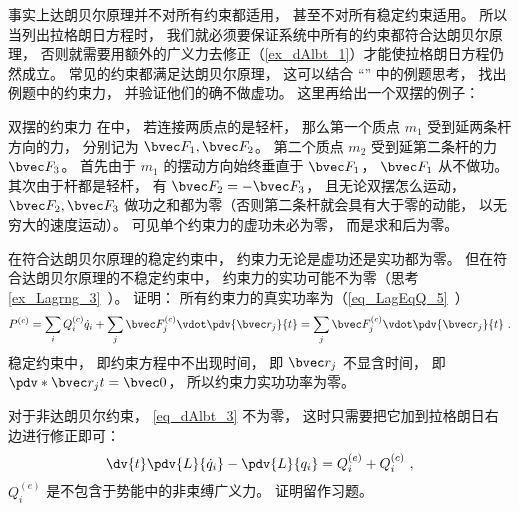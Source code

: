事实上达朗贝尔原理并不对所有约束都适用， 甚至不对所有稳定约束适用。 所以当列出拉格朗日方程时， 我们就必须要保证系统中所有的约束都符合达朗贝尔原理， 否则就需要用额外的广义力去修正（\autoref{ex_dAlbt_1}）才能使拉格朗日方程仍然成立。 常见的约束都满足达朗贝尔原理， 这可以结合 “” 中的例题思考， 找出例题中的约束力， 并验证他们的确不做虚功。 这里再给出一个双摆的例子：

\begin{example}{双摆的约束力}
在中， 若连接两质点的是轻杆， 那么第一个质点 $m_1$ 受到延两条杆方向的力， 分别记为 $\bvec F_1, \bvec F_2$。 第二个质点 $m_2$ 受到延第二条杆的力 $\bvec F_3$。 首先由于 $m_1$ 的摆动方向始终垂直于 $\bvec F_1$， $\bvec F_1$ 从不做功。 其次由于杆都是轻杆， 有 $\bvec F_2 = -\bvec F_3$， 且无论双摆怎么运动， $\bvec F_2, \bvec F_3$ 做功之和都为零（否则第二条杆就会具有大于零的动能， 以无穷大的速度运动）。 可见单个约束力的虚功未必为零， 而是求和后为零。
\end{example}

在符合达朗贝尔原理的稳定约束中， 约束力无论是虚功还是实功都为零。 但在符合达朗贝尔原理的不稳定约束中， 约束力的实功可能不为零（思考\autoref{ex_Lagrng_3}~）。 证明： 所有约束力的真实功率为（\autoref{eq_LagEqQ_5}~）
\begin{equation}
P^{(c)} = \sum_i Q_i^{(c)} \dot q_i + \sum_j \bvec F_j^{(c)} \vdot \pdv{\bvec r_j}{t} = \sum_j \bvec F_j^{(c)} \vdot \pdv{\bvec r_j}{t}~.
\end{equation}
稳定约束中， 即约束方程中不出现时间， 即 $\bvec r_j$ 不显含时间， 即 $\pdv*{\bvec r_j}{t} = \bvec 0$， 所以约束力实功功率为零。

对于非达朗贝尔约束， \autoref{eq_dAlbt_3} 不为零， 这时只需要把它加到拉格朗日右边进行修正即可：
\begin{equation}
\dv{t}\pdv{L}{\dot q_i} - \pdv{L}{q_i} = Q_i^{(e)} + Q_i^{(c)}~,
\end{equation}
$Q_i^{(e)}$ 是不包含于势能中的非束缚广义力。 证明留作习题。

